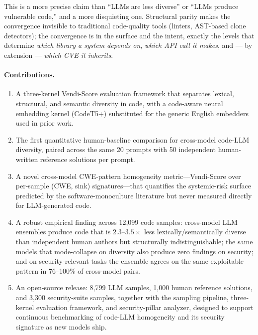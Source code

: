 \documentclass{article}
\begin{document}
This is a more precise claim than ``LLMs are less diverse'' or ``LLMs produce
vulnerable code,'' and a more disquieting one. Structural parity makes the
convergence invisible to traditional code-quality tools (linters, AST-based
clone detectors); the convergence is in the surface and the intent, exactly
the levels that determine \emph{which library a system depends on}, \emph{which
API call it makes}, and --- by extension --- \emph{which CVE it inherits}.

\paragraph{Contributions.}
\begin{enumerate}[leftmargin=*]
  \item A three-kernel Vendi-Score evaluation framework that separates
    lexical, structural, and semantic diversity in code, with a code-aware
    neural embedding kernel (CodeT5+) substituted for the generic English
    embedders used in prior work.
  \item The first quantitative human-baseline comparison for cross-model
    code-LLM diversity, paired across the same 20 prompts with 50 independent
    human-written reference solutions per prompt.
  \item A novel cross-model CWE-pattern homogeneity metric---Vendi-Score
    over per-sample (CWE, sink) signatures---that quantifies the
    systemic-risk surface predicted by the software-monoculture literature
    but never measured directly for LLM-generated code.
  \item A robust empirical finding across 12{,}099 code samples: cross-model
    LLM ensembles produce code that is $2.3$--$3.5\times$ less
    lexically/semantically diverse than independent human authors but
    structurally indistinguishable; the same models that mode-collapse on
    diversity also produce zero findings on security; and on
    security-relevant tasks the ensemble agrees on the same exploitable
    pattern in 76--100\% of cross-model pairs.
  \item An open-source release: 8{,}799 LLM samples, 1{,}000 human reference
    solutions, and 3{,}300 security-suite samples, together with the
    sampling pipeline, three-kernel evaluation framework, and security-pillar
    analyzer, designed to support continuous benchmarking of code-LLM
    homogeneity and its security signature as new models ship.
\end{enumerate}
\end{document}
